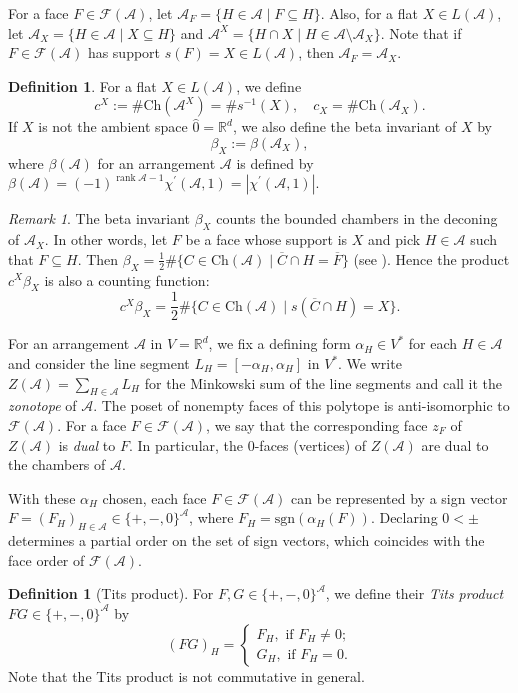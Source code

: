 \documentclass{amsart}
\numberwithin{equation}{section}
\theoremstyle{plain}
\theoremstyle{remark}
\newtheorem{rem}[thm]{Remark}
\theoremstyle{definition}
\newtheorem{defn}[thm]{Definition}
\numberwithin{equation}{section}
\newcommand{\A}{\mathcal{A}}
\newcommand{\FF}{\mathcal{F}}
\newcommand{\R}{\mathbb{R}}
\newcommand{\Ch}{\mathrm{Ch}}
\DeclareMathOperator{\rank}{rank}
\begin{document}
For a face $F\in\FF(\A)$, let $\A_F=\{H\in\A\mid F\subseteq H\}$. Also, for a flat $X\in L(\A)$, let $\A_X=\{H\in\A\mid X\subseteq H\}$ and $\A^X=\{H\cap X\mid H\in\A\setminus\A_X\}$. Note that if $F\in\FF(\A)$ has support $s(F)=X\in L(\A)$, then $\A_F=\A_X$. 
\begin{defn}\label{cX}
    For a flat $X\in L(\A)$, we define
    \[
    c^X:=\#\Ch(\A^X)=\#s^{-1}(X),\quad c_X=\#\Ch(\A_X).
    \]
    If $X$ is not the ambient space $\hat{0}=\R^d$, we also define the beta invariant of $X$ by
    \[
    \beta_X:=\beta(\A_X),
    \]
    where $\beta(\A)$ for an arrangement $\A$ is defined by $\beta(\A)=(-1)^{\rank \A-1}\chi^{\prime}(\A,1)=|\chi^{\prime}(\A,1)|$.
\end{defn}
\begin{rem}
    The beta invariant $\beta_X$ counts the bounded chambers in the deconing of $\A_X$. In other words, let $F$ be a face whose support is $X$ and pick $H\in\A$ such that $F\subseteq H$. Then $\beta_X=\frac{1}{2}\#\{C\in\Ch(\A)\mid \overline{C}\cap H=\overline{F}\}$ (see \cite{Zaslavsky1975,Aguiar2017,Stanley2007}). Hence the product $c^X\beta_X$ is also a counting function:
    \[
    c^X\beta_X=\frac{1}{2}\#\{C\in\Ch(\A)\mid s(\overline{C}\cap H)=X\}.
    \]
\end{rem}

For an arrangement $\A$ in $V=\R^d$, we fix a defining form $\alpha_H\in V^*$ for each $H\in\A$ and consider the line segment $L_H=[-\alpha_H,\alpha_H]$ in $V^*$. We write $Z(\A)=\sum_{H\in\A}L_H$ for the Minkowski sum of the line segments and call it the \emph{zonotope} of $\A$. The poset of nonempty faces of this polytope is anti-isomorphic to $\FF(\A)$. For a face $F\in\FF(\A)$, we say that the corresponding face $z_F$ of $Z(\A)$ is \emph{dual} to $F$. In particular, the $0$-faces (vertices) of $Z(\A)$ are dual to the chambers of $\A$.

With these $\alpha_H$ chosen, each face $F\in\FF(\A)$ can be represented by a sign vector $F=(F_H)_{H\in\A}\in\{+,-,0\}^{\A}$, where $F_H=\mathrm{sgn}(\alpha_H(F))$. Declaring $0<\pm$ determines a partial order on the set of sign vectors, which coincides with the face order of $\FF(\A)$.

\begin{defn}[Tits product]
    For $F,G\in \{+,-,0\}^\A$, we define their \emph{Tits product} $FG\in \{+,-,0\}^\A$ by
    \[
    (FG)_H=\begin{cases}
    F_H, \text{ if }F_H\neq 0;\\
    G_H, \text{ if }F_H=0.
    \end{cases}
    \]
    Note that the Tits product is not commutative in general.
\end{defn}
\end{document}
